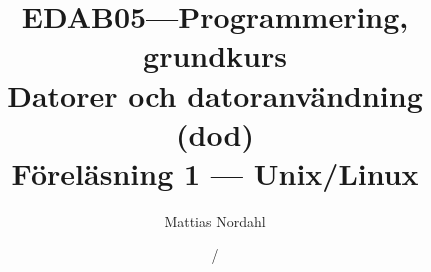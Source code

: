 \documentclass[handout]{beamer}
\author[]{Mattias Nordahl}
\institute{\url{mattias.nordahl@cs.lth.se}}
\date{}
\begin{document}
\title{{\small\bf EDAB05---Programmering, grundkurs}\\Datorer och datoranvändning (dod)\\Föreläsning 1 --- Unix/Linux}

\frame[plain]{
    \maketitle
    \vspace{-2\baselineskip}
}

\date{\the\year/\the\numexpr{}}


\end{document}
